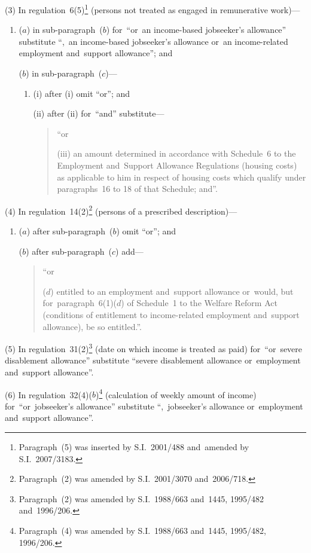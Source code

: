 \documentclass[12pt,a4paper]{article}
\begin{document}
(3) In regulation~6(5)\footnote{Paragraph~(5) was inserted by S.I.~2001/488 and~amended by S.I.~2007/3183.} (persons not treated as engaged in remunerative work)—
\begin{enumerate}\item[]
($a$) in sub-paragraph~($b$)  for~“or~an income-based jobseeker’s allowance” substitute “,~an income-based jobseeker’s allowance or~an income-related employment and~support allowance”; and

($b$) in sub-paragraph~($c$)—
\begin{enumerate}\item[]
(i) after (i)  omit “or”; and

(ii) after (ii)  for~“and” substitute—
\begin{quotation}
“or

(iii) an amount determined in accordance with Schedule~6 to the Employment and~Support Allowance Regulations (housing costs) as applicable to him in respect of housing costs which qualify under paragraphs~16 to 18 of that Schedule; and”.
\end{quotation}
\end{enumerate}
\end{enumerate}

(4) In regulation~14(2)\footnote{Paragraph~(2) was amended by S.I.~2001/3070 and~2006/718.} (persons of a prescribed description)—
\begin{enumerate}\item[]
($a$) after sub-paragraph~($b$)  omit “or”; and

($b$) after sub-paragraph~($c$)  add—
\begin{quotation}
“or

($d$) entitled to an employment and~support allowance or~would, but for~paragraph~6(1)($d$)  of Schedule~1 to the Welfare Reform Act (conditions of entitlement to income-related employment and~support allowance), be so entitled.”.
\end{quotation}
\end{enumerate}

(5) In regulation~31(2)\footnote{Paragraph~(2) was amended by S.I.~1988/663 and~1445, 1995/482 and~1996/206.} (date on which income is treated as paid) for~“or~severe disablement allowance” substitute “severe disablement allowance or~employment and~support allowance”.

(6) In regulation~32(4)($b$)\footnote{Paragraph~(4) was amended by S.I.~1988/663 and~1445, 1995/482, 1996/206.} (calculation of weekly amount of income) for~“or~jobseeker’s allowance” substitute “,~jobseeker’s allowance or~employment and~support allowance”.
\end{document}
